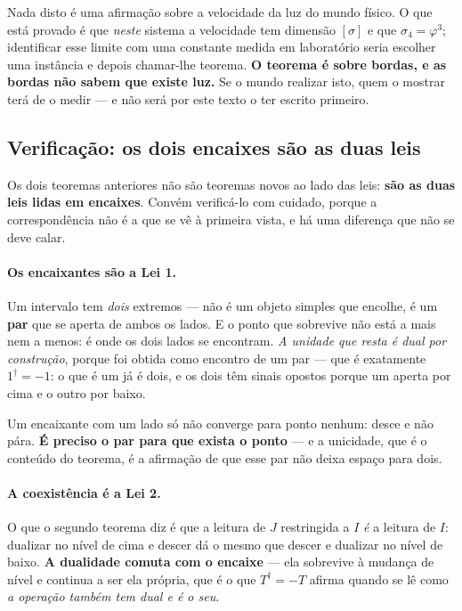 \documentclass[livro.tex]{subfiles}
\begin{document}
\medskip
\noindent Nada disto é uma afirmação sobre a
velocidade da luz do mundo físico. O que está provado é que \emph{neste} sistema a velocidade tem
dimensão $[\sigma]$ e que $\sigma_4=\varphi^{3}$; identificar esse limite com uma constante medida
em laboratório seria escolher uma instância e depois chamar-lhe teorema. \textbf{O teorema é sobre
bordas, e as bordas não sabem que existe luz.} Se o mundo realizar isto, quem o mostrar terá de o
medir --- e não será por este texto o ter escrito primeiro.


\subsection{Verificação: os dois encaixes são as duas leis}\label{sec:encaixeleis}

\noindent Os dois teoremas anteriores não são teoremas novos ao lado das leis: \textbf{são as duas
leis lidas em encaixes}. Convém verificá-lo com cuidado, porque a correspondência não é a que se
vê à primeira vista, e há uma diferença que não se deve calar.

\paragraph{Os encaixantes são a Lei 1.} Um intervalo tem \emph{dois} extremos --- não é um objeto
simples que encolhe, é um \textbf{par} que se aperta de ambos os lados. E o ponto que sobrevive não
está a mais nem a menos: é onde os dois lados se encontram. \emph{A unidade que resta é dual por
construção}, porque foi obtida como encontro de um par --- que é exatamente $1^{\dagger}=-1$: o que
é um já é dois, e os dois têm sinais opostos porque um aperta por cima e o outro por baixo.

\medskip
\noindent Um encaixante com um lado só não converge para ponto nenhum: desce e não pára. \textbf{É
preciso o par para que exista o ponto} --- e a unicidade, que é o conteúdo do teorema, é a
afirmação de que esse par não deixa espaço para dois.

\paragraph{A coexistência é a Lei 2.} O que o segundo teorema diz é que a leitura de $J$
restringida a $I$ \emph{é} a leitura de $I$: dualizar no nível de cima e descer dá o mesmo que
descer e dualizar no nível de baixo. \textbf{A dualidade comuta com o encaixe} --- ela sobrevive à
mudança de nível e continua a ser ela própria, que é o que $T^{\dagger}=-T$ afirma quando se lê
como \emph{a operação também tem dual e é o seu}.
\end{document}
